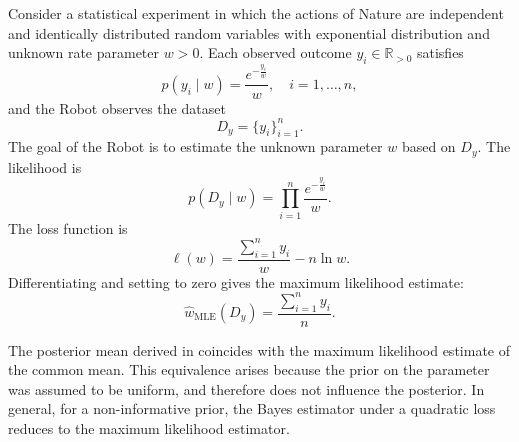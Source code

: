 \begin{example}
	\label{ex:exponential_mle}
	Consider a statistical experiment in which the actions of Nature are independent and identically distributed random variables with exponential distribution and unknown rate parameter $w>0$. Each observed outcome $y_i \in \mathbb{R}_{>0}$ satisfies
	\begin{equation}
		p(y_i \mid w) = \frac{e^{-\frac{y_i}{w}}}{w}, \quad i = 1, \dots, n,
	\end{equation}
	and the Robot observes the dataset
	\begin{equation}
		D_y = \{y_i\}_{i=1}^n.
	\end{equation}
	The goal of the Robot is to estimate the unknown parameter $w$ based on $D_y$. The likelihood is
	\begin{equation}
		p(D_y \mid w) = \prod_{i=1}^n \frac{e^{-\frac{y_i}{w}}}{w}.
	\end{equation}
	The loss function is
	\begin{equation}
		\ell(w) = \frac{\sum_{i=1}^n y_i}{w}-n \ln w.
	\end{equation}
	Differentiating and setting to zero gives the maximum likelihood estimate:
	\begin{equation}
		\hat{w}_{\mathrm{MLE}}(D_y) = \frac{\sum_{i=1}^n y_i}{n}.
	\end{equation}
\end{example}

\begin{example}
	The posterior mean derived in  coincides with the maximum likelihood estimate of the common mean. This equivalence arises because the prior on the parameter was assumed to be uniform, and therefore does not influence the posterior. In general, for a non-informative prior, the Bayes estimator under a quadratic loss reduces to the maximum likelihood estimator.
\end{example}

